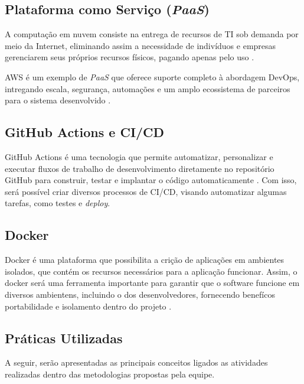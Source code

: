 \subsection{Plataforma como Serviço (\textit{PaaS})}
A computação em nuvem consiste na entrega de recursos de TI sob demanda por meio da Internet, eliminando assim a necessidade de indivíduos e empresas gerenciarem seus próprios recursos físicos, pagando apenas pelo uso \cite{awscloudcomputing}.

AWS é um exemplo de \textit{PaaS} que oferece suporte completo à abordagem DevOps, intregando escala, segurança, automações e um amplo ecossistema de parceiros para o sistema desenvolvido \cite{awsdevops}.

\subsection{GitHub Actions e CI/CD}
GitHub Actions é uma tecnologia que permite automatizar, personalizar e executar fluxos de trabalho de desenvolvimento diretamente no repositório GitHub para construir, testar e implantar o código automaticamente \cite{githubactions}. Com isso, será possível criar diversos processos de CI/CD, visando automatizar algumas tarefas, como testes e \textit{deploy}.

\subsection{Docker}
Docker é uma plataforma que possibilita a crição de aplicações em ambientes isolados, que contém os recursos necessários para a aplicação funcionar. Assim, o docker será uma ferramenta importante para garantir que o software funcione em diversos ambientens, incluindo o dos desenvolvedores, fornecendo benefícos portabilidade e isolamento dentro do projeto \cite{dockerdocs}.

\subsection{Práticas Utilizadas}
A seguir, serão apresentadas as principais conceitos ligados as atividades realizadas dentro das metodologias propostas pela equipe.

